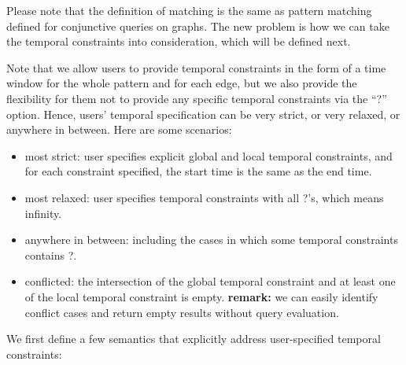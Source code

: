 Please note that the definition of matching is the same as pattern matching
defined for conjunctive queries on graphs. The new problem is how we can take
the temporal constraints into consideration, which will be defined next.

Note that we allow users to provide temporal constraints in the form of a time
window for the whole pattern and for each edge, but we also provide the
flexibility for them not to provide any specific temporal constraints via the
``?'' option. Hence, users' temporal specification can be very strict, or very
relaxed, or anywhere in between. Here are some scenarios:

\begin{itemize}
        \item most strict: user specifies explicit global and local temporal
          constraints, and for each constraint specified, the start time is the
          same as the end time.
	\item most relaxed: user specifies temporal constraints with all ?'s,
          which means infinity.
	\item anywhere in between: including the cases in which some temporal
          constraints contains ?.
        \item conflicted: the intersection of the global temporal constraint and
          at least one of the local temporal constraint is empty. {\bf remark:}
          we can easily identify conflict cases and return empty results without
          query evaluation.
\end{itemize}

We first define a few semantics that explicitly address user-specified temporal
constraints:

